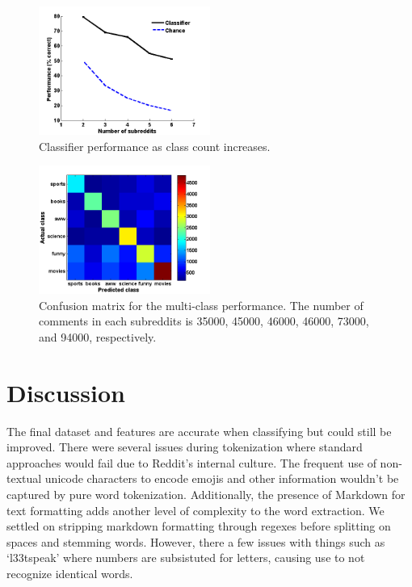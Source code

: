 \documentclass[10pt,twocolumn]{article}
\begin{document}
\begin{figure}
    \centering
  	\includegraphics[width=0.5\textwidth]{./varyWBaseline.png}
  	\caption{Classifier performance as class count increases.}
  	\label{classes}
\end{figure}	

\begin{figure}
    \centering
  	\includegraphics[width=0.5\textwidth]{./confusion_mat.png}
  	\caption{Confusion matrix for the multi-class performance. The number of comments in each subreddits is 35000, 45000, 46000, 46000, 73000, and 94000, respectively.}
  	\label{confusion}
\end{figure}	

\section{Discussion}
The final dataset and features are accurate when classifying but could still be improved. There were several issues during tokenization where standard approaches would fail due to Reddit's internal culture. The frequent use of non-textual unicode characters to encode emojis and other information wouldn't be captured by pure word tokenization. Additionally, the presence of Markdown for text formatting adds another level of complexity to the word extraction. We settled on stripping markdown formatting through regexes before splitting on spaces and stemming words. However, there a few issues with things such as `l33tspeak' where numbers are subsistuted for letters, causing use to not recognize identical words. 
\end{document}
